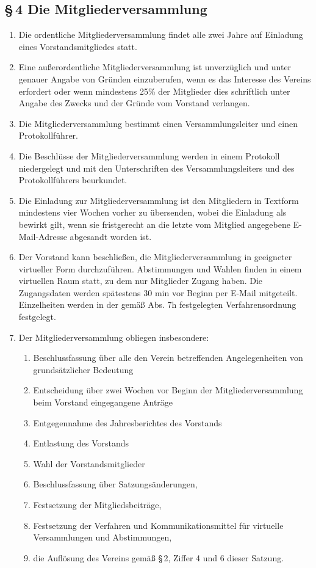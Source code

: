 \documentclass[12pt,a4paper]{article}
\begin{document}
\subsection*{§\,4 Die Mitgliederversammlung}
\begin{enumerate}
\item Die ordentliche Mitgliederversammlung findet alle zwei Jahre auf Einladung eines Vorstandsmitgliedes statt.
\item Eine außerordentliche Mitgliederversammlung ist unverzüglich und unter genauer Angabe von Gründen einzuberufen, wenn es das Interesse des Vereins erfordert oder wenn mindestens 25\% der Mitglieder dies schriftlich unter Angabe des Zwecks und der Gründe vom Vorstand verlangen.
\item Die Mitgliederversammlung bestimmt einen Versammlungsleiter und einen Protokollführer.
\item Die Beschlüsse der Mitgliederversammlung werden in einem Protokoll niedergelegt und mit den Unterschriften des Versammlungsleiters und des Protokollführers beurkundet.
\item Die Einladung zur Mitgliederversammlung ist den Mitgliedern in Textform mindestens vier Wochen vorher zu übersenden, wobei die Einladung als bewirkt gilt, wenn sie fristgerecht an die letzte vom Mitglied angegebene E-Mail-Adresse abgesandt worden ist.
\item Der Vorstand kann beschließen, die Mitgliederversammlung in geeigneter virtueller Form durchzuführen. Abstimmungen und Wahlen finden in einem virtuellen Raum statt, zu dem nur Mitglieder Zugang haben. Die Zugangsdaten werden spätestens 30 min vor Beginn per E-Mail mitgeteilt. Einzelheiten werden in der gemäß Abs. 7h festgelegten Verfahrensordnung festgelegt.
\item Der Mitgliederversammlung obliegen insbesondere:
\begin{enumerate}
\item Beschlussfassung über alle den Verein betreffenden Angelegenheiten von grundsätzlicher Bedeutung
\item Entscheidung über zwei Wochen vor Beginn der Mitgliederversammlung beim Vorstand eingegangene Anträge
\item Entgegennahme des Jahresberichtes des Vorstands
\item Entlastung des Vorstands
\item Wahl der Vorstandsmitglieder
\item Beschlussfassung über Satzungsänderungen,
\item Festsetzung der Mitgliedsbeiträge,
\item Festsetzung der Verfahren und Kommunikationsmittel für virtuelle Versammlungen und Abstimmungen, 
\item die Auflösung des Vereins gemäß §\,2, Ziffer 4 und 6 dieser Satzung.
\end{enumerate}
\end{enumerate}
\end{document}
